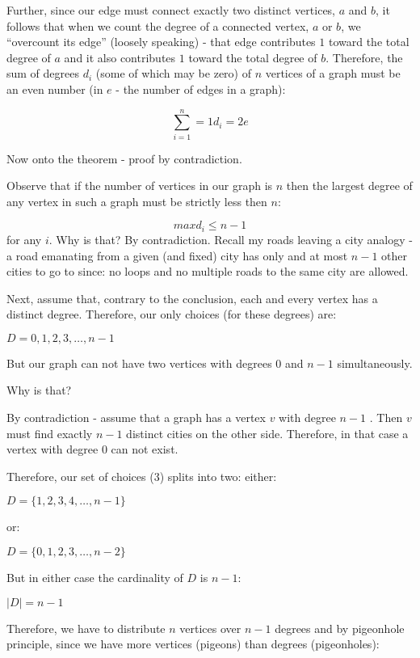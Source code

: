 \begin{enumerate}
          Further, since our edge must connect exactly two distinct vertices, $a$ and $b$, it follows that when we count the degree of a connected vertex, $a$ or $b$, we “overcount its edge” (loosely speaking) - that edge contributes $1$ toward the total degree of $a$ and it also contributes $1$ toward the total degree of $b$.
          Therefore, the sum of degrees $d_{i}$ (some of which may be zero) of $n$ vertices of a graph must be an even number (in $e$ - the number of edges in a graph):

          $$\sum^{n}_{i=1}=1 d_{i}=2e$$

          Now onto the theorem - proof by contradiction.

          Observe that if the number of vertices in our graph is $n$ then the largest degree of any vertex in such a graph must be strictly less then $n$:

          $$max d_{i} \leq n-1$$
          for any $i$. Why is that? By contradiction. Recall my roads leaving a city analogy - a road emanating from a given (and fixed) city has only and at most $n - 1$ other cities to go to since:
          no loops and
          no multiple roads to the same city
          are allowed.

          Next, assume that, contrary to the conclusion, each and every vertex has a distinct degree. Therefore, our only choices (for these degrees) are:

          $D={0,1,2,3,\ldots ,n-1}$

          But our graph can not have two vertices with degrees $0$ and $n-1$ simultaneously.

          Why is that?

          By contradiction - assume that a graph has a vertex $v$ with degree $n-1$ . Then $v$ must find exactly $n-1$ distinct cities on the other side. Therefore, in that case a vertex with degree $0$ can not exist.

          Therefore, our set of choices (3) splits into two: either:

          $D = \{ 1 , 2 , 3 , 4 , \ldots ,n - 1 \}$

          or:

          $D = \{ 0, 1, 2, 3, \ldots , n-2\}$


          But in either case the cardinality of $D$ is $n-1$:

          $|D|=n-1$

          Therefore, we have to distribute $n$ vertices over $n-1$ degrees and by pigeonhole principle, since we have more vertices (pigeons) than degrees (pigeonholes):


\end{enumerate}
